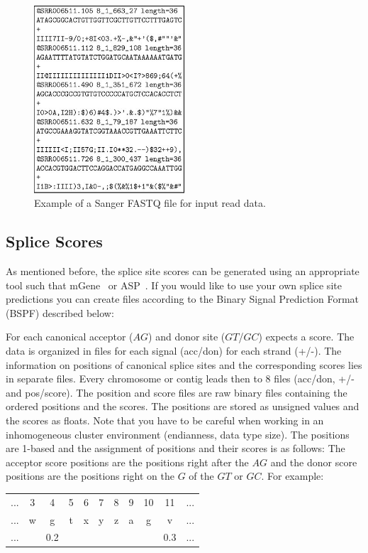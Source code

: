 \documentclass{article}
\begin{document}
\begin{figure}[h!]
\begin{center}
\includegraphics[width=0.5\textwidth]{ReadFile.jpg}
\end{center}
\caption{Example of a Sanger FASTQ file for input read data.}
\label{fig:fastq}
\end{figure}

\subsection{Splice Scores}
\label{sec:splicescoresfile}

As mentioned before, the splice site scores can be generated using an
appropriate tool such that
mGene~\cite{Schweikertetal09,Schweikertetal09b} or
ASP~\cite{Sonnenburgetal07}. If you would like to use your own splice
site predictions you can create files according to the Binary Signal 
Prediction Format (BSPF) described below: 

For each canonical acceptor ($AG$) and donor site ($GT$/$GC$)
\PALMapper{} expects a score. The data is organized in files for each
signal (acc/don) for each strand (+/-). The information on positions of
canonical splice sites and the corresponding scores lies in separate
files. Every chromosome or contig leads then to $8$ files (acc/don, +/-
and pos/score). The position and score files are raw binary files
containing the ordered positions and the scores. The positions are
stored as unsigned values and the scores as floats. Note that you have
to be careful when working in an inhomogeneous cluster environment
(endianness, data type size). The positions are 1-based and the
assignment of positions and their scores is as follows: The acceptor
score positions are the positions right after the $AG$ and the donor
score positions are the positions right on the $G$ of the $GT$ or
$GC$. For example:
\begin{center}
\begin{tabular}{ccccccccccc}
... & 3 & 4 & 5 & 6 & 7 & 8 & 9 & 10 & 11 & ... \\ 
... & w & g & t & x & y & z & a & g  & v  & ... \\
... &   & 0.2&  &   &   &   &   &    & 0.3 & ... 
\end{tabular}
\end{center}
\end{document}
